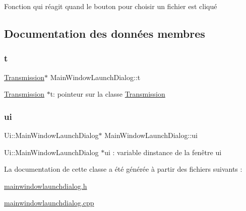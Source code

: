 Fonction qui réagit quand le bouton pour choisir un fichier est cliqué 



\subsection{Documentation des données membres}
\mbox{\label{classMainWindowLaunchDialog_a99241b2f7c2317788d83716301f33b1c}} 
\subsubsection{\texorpdfstring{t}{t}}
{\footnotesize\ttfamily \hyperlink{classTransmission}{Transmission}$\ast$ Main\+Window\+Launch\+Dialog\+::t\hspace{0.3cm}{\ttfamily [private]}}

\hyperlink{classTransmission}{Transmission} $\ast$t\+: pointeur sur la classe \hyperlink{classTransmission}{Transmission} \mbox{\label{classMainWindowLaunchDialog_ab79dbe386d19b41840ab6489ed73cacf}} 
\subsubsection{\texorpdfstring{ui}{ui}}
{\footnotesize\ttfamily Ui\+::\+Main\+Window\+Launch\+Dialog$\ast$ Main\+Window\+Launch\+Dialog\+::ui\hspace{0.3cm}{\ttfamily [private]}}

Ui\+::\+Main\+Window\+Launch\+Dialog $\ast$ui \+: variable d\textquotesingle{}instance de la fenêtre ui 

La documentation de cette classe a été générée à partir des fichiers suivants \+:\begin{DoxyCompactItemize}
\item 
\hyperlink{mainwindowlaunchdialog_8h}{mainwindowlaunchdialog.\+h}\item 
\hyperlink{mainwindowlaunchdialog_8cpp}{mainwindowlaunchdialog.\+cpp}\end{DoxyCompactItemize}
